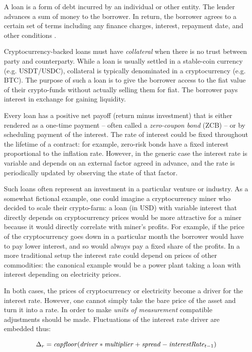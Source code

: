 \documentclass[runningheads]{llncs}
\newcommand{\ident}[1]{\mbox{\emph{#1}}}
\begin{document}
A loan is a form of debt incurred by an individual or other entity.
The lender advances a sum of money to the borrower. In return, the
borrower agrees to a certain set of terms including any finance charges,
interest, repayment date, and other conditions \cite{loan}.

Cryptocurrency-backed loans must have \emph{collateral} when there is no trust
between party and counterparty. While a loan is usually settled in a
stable-coin currency (e.g. USDT/USDC), collateral is typically denominated
in a cryptocurrency (e.g. BTC). The purpose of such a loan is to give
the borrower access to the fiat value of their crypto-funds without
actually selling them for fiat. The borrower pays interest in exchange
for gaining liquidity.

Every loan has a positive net payoff (return minus investment) that
is either rendered as a one-time payment -- often called a \emph{zero-coupon bond} (ZCB) -- or by scheduling
payment of the interest. The rate of interest could be fixed throughout
the lifetime of a contract: for example, zero-risk bonds have a fixed
interest proportional to the inflation rate.
However, in the generic case the interest rate is variable and depends
on an external factor agreed in advance, and the rate is periodically
updated by observing the state of that factor. 

Such loans often represent an investment in a particular venture or industry. As
a somewhat fictional example, one could imagine a cryptocurrency miner
who decided to scale their crypto-farm: a loan (in USD) with variable
interest that directly depends on cryptocurrency prices would be more
attractive for a miner because it would directly correlate with miner's
profits. For example, if the price of the cryptocurrency goes down
in a particular month the borrower would have to pay lower interest, and so would always pay a fixed share of the profits. In a more traditional
setup the interest rate could depend on prices of other commodities: the canonical example would be a power plant taking a loan
with interest depending on electricity prices. 

In both cases, the prices of
cryptocurrency or electricity become a driver for the interest
rate.
However, one cannot simply take the bare price of the asset and turn
it into a rate. In order to make \emph{units of measurement} compatible
adjustments should be made. Fluctuations of the interest rate driver
are embedded thus:

\noindent 
\begin{equation}
\Delta_{r}=\ident{capfloor}(\ident{driver}*\ident{multiplier}+\ident{spread}-\ident{interestRate}_{t-1})
\end{equation}
\end{document}
